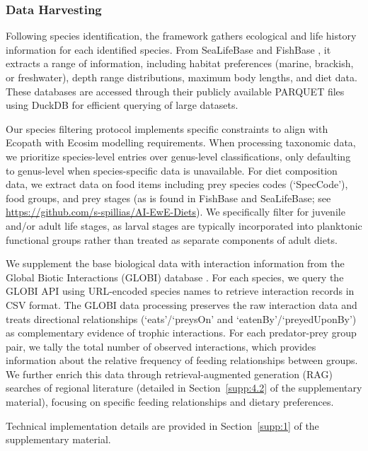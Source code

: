 \subsubsection{Data Harvesting}

Following species identification, the framework gathers ecological and life history information for each identified species. From SeaLifeBase and FishBase \citep{froese2010fishbase}, it extracts a range of information, including habitat preferences (marine, brackish, or freshwater), depth range distributions, maximum body lengths, and diet data. These databases are accessed through their publicly available PARQUET files using DuckDB for efficient querying of large datasets. 

Our species filtering protocol implements specific constraints to align with Ecopath with Ecosim modelling requirements. When processing taxonomic data, we prioritize species-level entries over genus-level classifications, only defaulting to genus-level when species-specific data is unavailable. For diet composition data, we extract data on food items including prey species codes (`SpecCode'), food groups, and prey stages (as is found in FishBase and SeaLifeBase; see \url{https://github.com/s-spillias/AI-EwE-Diets}). We specifically filter for juvenile and/or adult life stages, as larval stages are typically incorporated into planktonic functional groups rather than treated as separate components of adult diets.

We supplement the base biological data with interaction information from the Global Biotic Interactions (GLOBI) database \citep{Poelen2014}. For each species, we query the GLOBI API using URL-encoded species names to retrieve interaction records in CSV format. The GLOBI data processing preserves the raw interaction data and treats directional relationships (`eats'/`preysOn' and `eatenBy'/`preyedUponBy') as complementary evidence of trophic interactions. For each predator-prey group pair, we tally the total number of observed interactions, which provides information about the relative frequency of feeding relationships between groups. We further enrich this data through retrieval-augmented generation (RAG) searches of regional literature (detailed in Section~\ref{supp:4.2} of the supplementary material), focusing on specific feeding relationships and dietary preferences.

Technical implementation details are provided in Section~\ref{supp:1} of the supplementary material.
